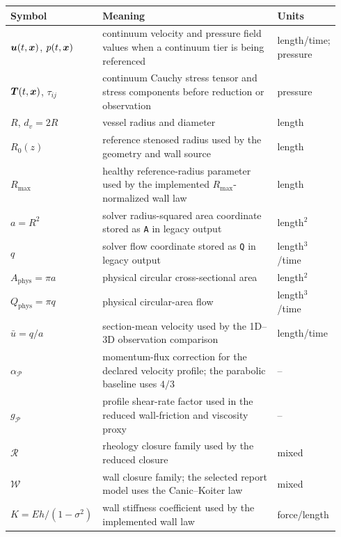 \noindent\begin{minipage}[t]{\textwidth}
\begin{compactacronymtables}
\setlength{\parskip}{0pt}
\begin{tabular}{@{}>{\raggedright\arraybackslash}p{0.24\linewidth}
        >{\raggedright\arraybackslash}p{0.56\linewidth}
        >{\raggedright\arraybackslash}p{0.14\linewidth}@{}}
        \toprule
        \textbf{Symbol} & \textbf{Meaning} & \textbf{Units} \\
        \midrule
        $\bm{u}(t,\bm{x})$, $p(t,\bm{x})$ & continuum velocity and pressure field values when a continuum tier is being referenced & length/time; pressure \\
        $\bm{T}(t,\bm{x})$, $\tau_{ij}$ & continuum Cauchy stress tensor and stress components before reduction or observation & pressure \\
        $R$, $d_v=2R$ & vessel radius and diameter & length \\
        $R_0(z)$ & reference stenosed radius used by the geometry and wall source & length \\
        $R_{\max}$ & healthy reference-radius parameter used by the implemented $R_{\max}$-normalized wall law & length \\
        $a=R^2$ & solver radius-squared area coordinate stored as \texttt{A} in legacy output & length$^2$ \\
        $q$ & solver flow coordinate stored as \texttt{Q} in legacy output & length$^3$/time \\
        $A_{\mathrm{phys}}=\pi a$ & physical circular cross-sectional area & length$^2$ \\
        $Q_{\mathrm{phys}}=\pi q$ & physical circular-area flow & length$^3$/time \\
        $\bar u=q/a$ & section-mean velocity used by the 1D--3D observation comparison & length/time \\
        $\alpha_{\mathcal P}$ & momentum-flux correction for the declared velocity profile; the parabolic baseline uses $4/3$ & -- \\
        $g_{\mathcal P}$ & profile shear-rate factor used in the reduced wall-friction and viscosity proxy & -- \\
        $\mathcal R$ & rheology closure family used by the reduced closure & mixed \\
        $\mathcal W$ & wall closure family; the selected report model uses the Canic--Koiter law & mixed \\
        $K=Eh/(1-\sigma^2)$ & wall stiffness coefficient used by the implemented wall law & force/length \\

\end{tabular}
\end{compactacronymtables}
\end{minipage}
